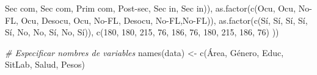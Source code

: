 \documentclass[
]{book}
\newenvironment{Shaded}{\begin{snugshade}}{\end{snugshade}}
\newcommand{\CommentTok}[1]{\textcolor[rgb]{0.56,0.35,0.01}{\textit{#1}}}
\newcommand{\DecValTok}[1]{\textcolor[rgb]{0.00,0.00,0.81}{#1}}
\newcommand{\FunctionTok}[1]{\textcolor[rgb]{0.00,0.00,0.00}{#1}}
\newcommand{\NormalTok}[1]{#1}
\newcommand{\OtherTok}[1]{\textcolor[rgb]{0.56,0.35,0.01}{#1}}
\newcommand{\StringTok}[1]{\textcolor[rgb]{0.31,0.60,0.02}{#1}}
\theoremstyle{definition}
\theoremstyle{definition}
\theoremstyle{definition}
\theoremstyle{definition}
\theoremstyle{remark}
\begin{document}
\begin{Shaded}
\begin{Highlighting}[]
                                        \StringTok{\textquotesingle{}Sec com\textquotesingle{}}\NormalTok{, }\StringTok{\textquotesingle{}Sec com\textquotesingle{}}\NormalTok{, }\StringTok{\textquotesingle{}Prim com\textquotesingle{}}\NormalTok{, }\StringTok{\textquotesingle{}Post{-}sec\textquotesingle{}}\NormalTok{,}
                                        \StringTok{\textquotesingle{}Sec in\textquotesingle{}}\NormalTok{, }\StringTok{\textquotesingle{}Sec in\textquotesingle{}}\NormalTok{)),}
                            \FunctionTok{as.factor}\NormalTok{(}\FunctionTok{c}\NormalTok{(}\StringTok{\textquotesingle{}Ocu\textquotesingle{}}\NormalTok{, }\StringTok{\textquotesingle{}Ocu\textquotesingle{}}\NormalTok{, }\StringTok{\textquotesingle{}No{-}FL\textquotesingle{}}\NormalTok{, }\StringTok{\textquotesingle{}Ocu\textquotesingle{}}\NormalTok{, }\StringTok{\textquotesingle{}Desocu\textquotesingle{}}\NormalTok{, }\StringTok{\textquotesingle{}Ocu\textquotesingle{}}\NormalTok{,}
                                        \StringTok{\textquotesingle{}No{-}FL\textquotesingle{}}\NormalTok{, }\StringTok{\textquotesingle{}Desocu\textquotesingle{}}\NormalTok{, }\StringTok{\textquotesingle{}No{-}FL\textquotesingle{}}\NormalTok{,}\StringTok{\textquotesingle{}No{-}FL\textquotesingle{}}\NormalTok{)),}
                            \FunctionTok{as.factor}\NormalTok{(}\FunctionTok{c}\NormalTok{(}\StringTok{\textquotesingle{}Sí\textquotesingle{}}\NormalTok{, }\StringTok{\textquotesingle{}Sí\textquotesingle{}}\NormalTok{, }\StringTok{\textquotesingle{}Sí\textquotesingle{}}\NormalTok{, }\StringTok{\textquotesingle{}Sí\textquotesingle{}}\NormalTok{, }\StringTok{\textquotesingle{}Sí\textquotesingle{}}\NormalTok{, }\StringTok{\textquotesingle{}No\textquotesingle{}}\NormalTok{, }\StringTok{\textquotesingle{}No\textquotesingle{}}\NormalTok{,}
                                        \StringTok{\textquotesingle{}Sí\textquotesingle{}}\NormalTok{, }\StringTok{\textquotesingle{}No\textquotesingle{}}\NormalTok{, }\StringTok{\textquotesingle{}Sí\textquotesingle{}}\NormalTok{)),}
                            \FunctionTok{c}\NormalTok{(}\DecValTok{180}\NormalTok{, }\DecValTok{180}\NormalTok{, }\DecValTok{215}\NormalTok{, }\DecValTok{76}\NormalTok{, }\DecValTok{186}\NormalTok{, }\DecValTok{76}\NormalTok{, }\DecValTok{180}\NormalTok{, }\DecValTok{215}\NormalTok{, }\DecValTok{186}\NormalTok{, }\DecValTok{76}\NormalTok{)}
\NormalTok{))}

\CommentTok{\# Especificar nombres de variables}
\FunctionTok{names}\NormalTok{(data) }\OtherTok{\textless{}{-}} \FunctionTok{c}\NormalTok{(}\StringTok{\textquotesingle{}Área\textquotesingle{}}\NormalTok{, }\StringTok{\textquotesingle{}Género\textquotesingle{}}\NormalTok{, }\StringTok{\textquotesingle{}Educ\textquotesingle{}}\NormalTok{, }\StringTok{\textquotesingle{}SitLab\textquotesingle{}}\NormalTok{, }\StringTok{\textquotesingle{}Salud\textquotesingle{}}\NormalTok{, }\StringTok{\textquotesingle{}Pesos\textquotesingle{}}\NormalTok{)               }


\end{Highlighting}
\end{Shaded}
\end{document}
